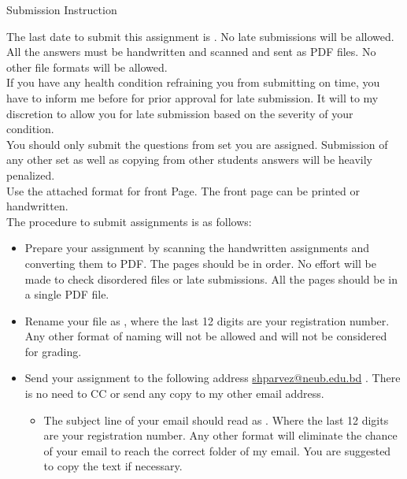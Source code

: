\begin{center}
    \Huge{Submission Instruction}
\end{center}
\bigskip

\large{
The last date to submit this assignment is \submissionDeadline. No late submissions will be allowed. All the answers must be handwritten and scanned and sent as PDF files. No other file formats will be allowed.\\

If you have any health condition refraining you from submitting on time, you have to inform me before \noticeDeadline for prior approval for late submission. It will to my discretion to allow you for late submission based on the severity of your condition.\\

You should only submit the questions from set you are assigned. Submission of any other set as well as copying from other students answers will be heavily penalized.\\

Use the attached format for front Page. The front page can be printed or handwritten.\\

The procedure to submit assignments is as follows:
\begin{itemize}
    \item Prepare your assignment by scanning the handwritten assignments and converting them to PDF. The pages should be in order. No effort will be made to check disordered files or late submissions. All the pages should be in a single PDF file.
    \item Rename your file as \textbf{\fileName}, where the last 12 digits are your registration number. Any other format of naming will not be allowed and will not be considered for grading.
    \item Send your assignment to the following address \href{mailto:shparvez@neub.edu.bd?subject=\emailSubject }{shparvez@neub.edu.bd} . There is no need to CC or send any copy to my other email address.
    \begin{itemize}
        \item The subject line of your email should read as \textbf{\emailSubject} . Where the last 12 digits are your registration number. Any other format will eliminate the chance of your email to reach the correct folder of my email. You are suggested to copy the text if necessary.
    \end{itemize}
\end{itemize}

}
